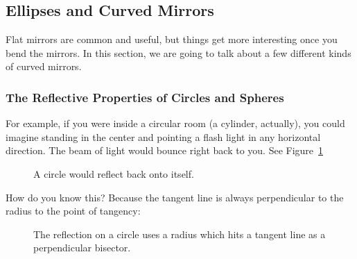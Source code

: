 \subsection{Ellipses and Curved Mirrors}

Flat mirrors are common and useful, but things get more interesting
once you bend the mirrors. In this section, we are going to talk about
a few different kinds of curved mirrors.

\subsubsection{The Reflective Properties of Circles and Spheres}

For example, if you were inside a circular room (a cylinder,
actually), you could imagine standing in the center and pointing a
flash light in any horizontal direction. The beam of light would
bounce right back to you. See Figure~\ref{fig:circlReflection}

\begin{figure}[H]
  \centering
  \caption{A circle would reflect back onto itself.}
  \label{fig:circlReflection}
\end{figure}

How do you know this?  Because the tangent line is always perpendicular to the radius to the point of tangency:
\begin{figure}[H]
  \centering
  \caption{The reflection on a circle uses a radius which hits a tangent line as a perpendicular bisector.}
  \label{fig:tangentCircle}
\end{figure}

